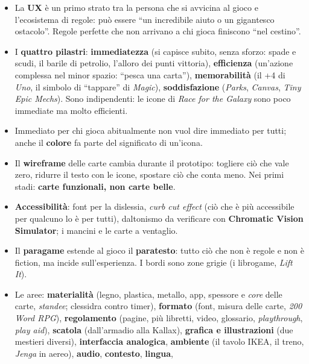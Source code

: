 \begin{itemize}
  \item La \textbf{UX} è un primo strato tra la persona che si avvicina al gioco e
        l'ecosistema di regole: può essere ``un incredibile aiuto o un gigantesco
        ostacolo''. Regole perfette che non arrivano a chi gioca finiscono ``nel
        cestino''.
  \item I \textbf{quattro pilastri}: \textbf{immediatezza} (si capisce subito, senza
        sforzo: spade e scudi, il barile di petrolio, l'alloro dei punti vittoria),
        \textbf{efficienza} (un'azione complessa nel minor spazio: ``pesca una carta''),
        \textbf{memorabilità} (il +4 di \emph{Uno}, il simbolo di ``tappare'' di
        \emph{Magic}), \textbf{soddisfazione} (\emph{Parks}, \emph{Canvas}, \emph{Tiny
        Epic Mechs}). Sono indipendenti: le icone di \emph{Race for the Galaxy} sono poco
        immediate ma molto efficienti.
  \item Immediato per chi gioca abitualmente non vuol dire immediato per tutti; anche il
        \textbf{colore} fa parte del significato di un'icona.
  \item Il \textbf{wireframe} delle carte cambia durante il prototipo: togliere ciò che
        vale zero, ridurre il testo con le icone, spostare ciò che conta meno. Nei primi
        stadi: \textbf{carte funzionali, non carte belle}.
  \item \textbf{Accessibilità}: font per la dislessia, \emph{curb cut effect} (ciò che è
        più accessibile per qualcuno lo è per tutti), daltonismo da verificare con
        \textbf{Chromatic Vision Simulator}; i mancini e le carte a ventaglio.
  \item Il \textbf{paragame} estende al gioco il \textbf{paratesto}: tutto ciò che non è
        regole e non è fiction, ma incide sull'esperienza. I bordi sono zone grigie
        (i librogame, \emph{Lift It}).
  \item Le aree: \textbf{materialità} (legno, plastica, metallo, app, spessore e
        \emph{core} delle carte, \emph{standee}; clessidra contro timer),
        \textbf{formato} (font, misura delle carte, \emph{200 Word RPG}),
        \textbf{regolamento} (pagine, più libretti, video, glossario,
        \emph{playthrough}, \emph{play aid}), \textbf{scatola} (dall'armadio alla
        Kallax), \textbf{grafica e illustrazioni} (due mestieri diversi),
        \textbf{interfaccia analogica}, \textbf{ambiente} (il tavolo IKEA, il treno,
        \emph{Jenga} in aereo), \textbf{audio}, \textbf{contesto}, \textbf{lingua},

\end{itemize}
